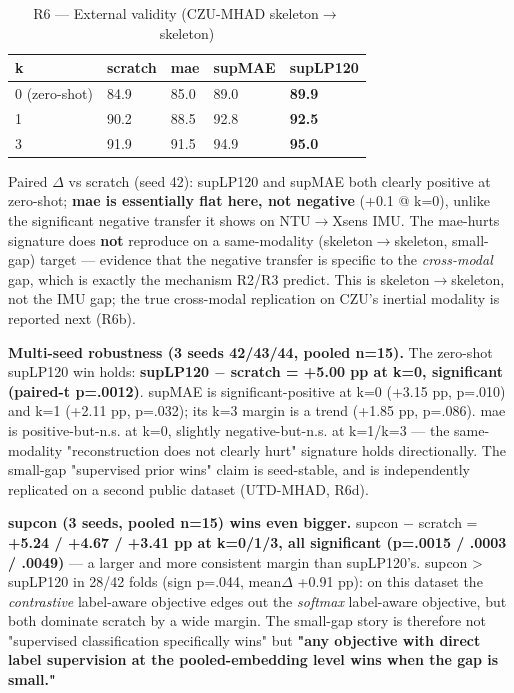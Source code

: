 \begin{table}[!t]
\centering
\caption{R6 --- External validity (CZU-MHAD skeleton$\rightarrow$skeleton)}
\small
\begin{tabular}{lllll}
\toprule
k & scratch & mae & supMAE & supLP120 \\
\midrule
0 (zero-shot) & 84.9 & 85.0 & 89.0 & \textbf{89.9} \\
1 & 90.2 & 88.5 & 92.8 & \textbf{92.5} \\
3 & 91.9 & 91.5 & 94.9 & \textbf{95.0} \\
\bottomrule
\end{tabular}
\end{table}

Paired $\Delta$ vs scratch (seed 42): supLP120 and supMAE both clearly positive at zero-shot; \textbf{mae is essentially flat here, not negative} (+0.1 @ k=0), unlike the significant negative transfer it shows on NTU$\rightarrow$Xsens IMU. The mae-hurts signature does \textbf{not} reproduce on a same-modality (skeleton$\rightarrow$skeleton, small-gap) target --- evidence that the negative transfer is specific to the \textit{cross-modal} gap, which is exactly the mechanism R2/R3 predict. This is skeleton$\rightarrow$skeleton, not the IMU gap; the true cross-modal replication on CZU's inertial modality is reported next (R6b).

\textbf{Multi-seed robustness (3 seeds 42/43/44, pooled n=15).} The zero-shot supLP120 win holds: \textbf{supLP120 $-$ scratch = +5.00 pp at k=0, significant (paired-t p=.0012)}. supMAE is significant-positive at k=0 (+3.15 pp, p=.010) and k=1 (+2.11 pp, p=.032); its k=3 margin is a trend (+1.85 pp, p=.086). mae is positive-but-n.s. at k=0, slightly negative-but-n.s. at k=1/k=3 --- the same-modality "reconstruction does not clearly hurt" signature holds directionally. The small-gap "supervised prior wins" claim is seed-stable, and is independently replicated on a second public dataset (UTD-MHAD, R6d).

\textbf{supcon (3 seeds, pooled n=15) wins even bigger.} supcon $-$ scratch = \textbf{+5.24 / +4.67 / +3.41 pp at k=0/1/3, all significant (p=.0015 / .0003 / .0049)} --- a larger and more consistent margin than supLP120's. supcon > supLP120 in 28/42 folds (sign p=.044, mean$\Delta$ +0.91 pp): on this dataset the \textit{contrastive} label-aware objective edges out the \textit{softmax} label-aware objective, but both dominate scratch by a wide margin. The small-gap story is therefore not "supervised classification specifically wins" but \textbf{"any objective with direct label supervision at the pooled-embedding level wins when the gap is small."}

